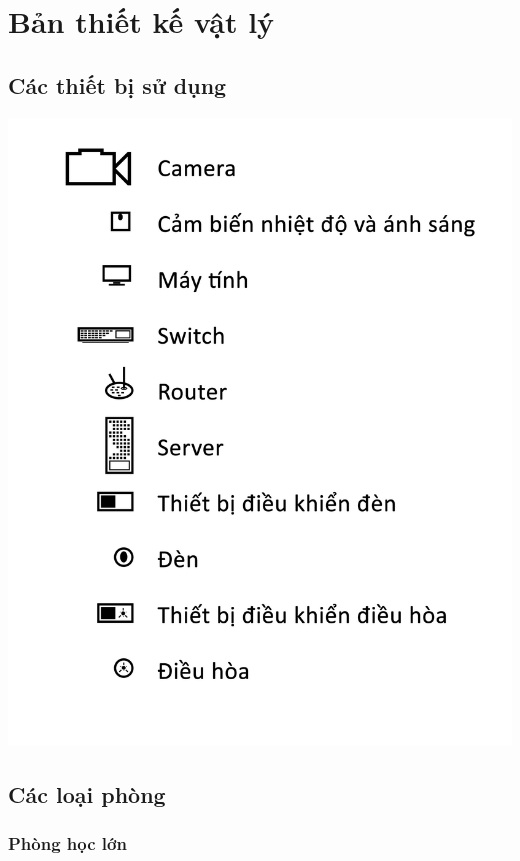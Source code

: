 \documentclass[12pt]{report}
\begin{document}
\newpage
\section{Bản thiết kế vật lý}
	
	\subsection{Các thiết bị sử dụng}
		\begin{center}
			\includegraphics[scale=0.15]{device.jpg} \\
		\end{center}
	
	\newpage
	\subsection{Các loại phòng}

		\subsubsection{Phòng học lớn}
		
\end{document}

